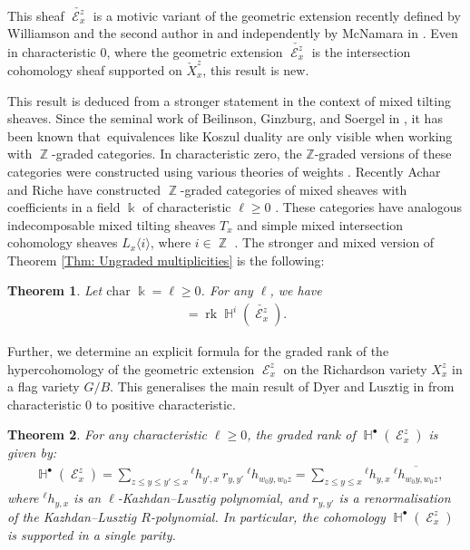 \documentclass[11pt]{article}
\DeclareMathOperator{\Z}{\mathbb{Z}}
\DeclareMathOperator{\bH}{\mathbb{H}}
\DeclareMathOperator{\sE}{\mathscr{E}}
\DeclareMathOperator{\rank}{rk}
\DeclareMathOperator{\grrk}{rk^{\bullet}}
\newtheorem{thm}{Theorem}
\theoremstyle{remark}
\theoremstyle{definition}
\begin{document}
	This sheaf $\check{\sE_x ^z}$ is a motivic variant of the geometric extension recently defined by Williamson and the second author in \cite{HW23} and independently by McNamara in \cite{McN18}. 
    Even in characteristic 0, where the geometric extension $\check{\sE_x^z}$ is the intersection cohomology sheaf supported on $\check{X}_x^z$, this result  is new. 
	\\
	\par
	This result is deduced from a stronger statement in the context of mixed tilting sheaves. 
	Since the seminal work of Beilinson, Ginzburg, and Soergel in \cite{BGS96}, it has been known that\ equivalences like Koszul duality are only visible when working with $\Z$-graded categories.
	In characteristic zero, the $\mathbb{Z}$-graded versions of these categories were constructed using various theories of weights \cite[\S4]{BGS96}. 
    Recently Achar and Riche have constructed $\Z$-graded categories of mixed sheaves with coefficients in a field $\Bbbk$ of characteristic $\ell \geq 0$ \cite{AR16}.
	These categories have analogous indecomposable mixed tilting sheaves $T_x$ and simple mixed intersection cohomology sheaves $L_x \langle i \rangle$, where $i \in \Z$ . 
	The stronger and mixed version of Theorem \ref{Thm: Ungraded multiplicities} is the following: 
	
	\begin{thm}\label{thm:main thm}
		Let $\text{char } \Bbbk = \ell\geq 0$. For any $\ell$, we have 
		\begin{align*}
			[T_x: L_z \langle i \rangle] 
			= 
			\rank \bH^{i}(\check{\sE_x^z}). 
		\end{align*}
	\end{thm}

	\par
    Further, we determine an explicit formula for the graded rank of the hypercohomology of the geometric extension $\sE_x^z$ on the Richardson variety $X_x^z$ in a flag variety $G/B$. 
	This generalises the main result of Dyer and Lusztig in \cite{DL23} from characteristic 0 to positive characteristic.	
	\begin{thm}\label{thm:geometric ranks}
		For any characteristic $\ell \geq 0$, the graded rank of $\bH^{\bullet}(\sE_x^z)$ is given by:
		\begin{align*}
			\grrk \bH^{\bullet}(\sE_x^z) 
			= 
			\sum_{z \leq y \leq y' \leq x} {}^{\ell} h_{y',x}  ~ r_{y,y'} ~ {}^{\ell} h_{w_0 y, w_0 z}
			= 
			\sum_{z \leq y \leq x} {}^{\ell} h_{y,x} ~\overline{{}^{\ell} h_{w_0 y, w_0 z}} ,
		\end{align*} 
        where ${}^{\ell} h_{y, x}$ is an $\ell$-Kazhdan--Lusztig polynomial, and $r_{y,y'}$ is a renormalisation of the Kazhdan--Lusztig $R$-polynomial. In particular, the cohomology $\bH^{\bullet}(\sE_x^z)$ is supported in a single parity.
	\end{thm}
\end{document}
